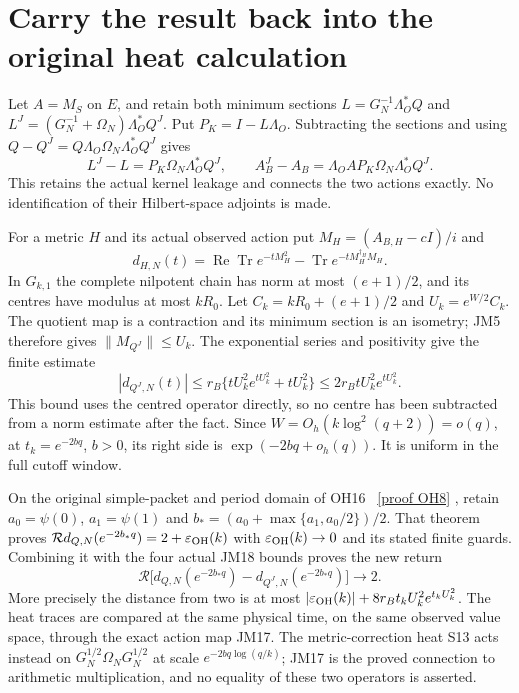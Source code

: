 \documentclass[11pt]{article}
\begin{document}
\section{Carry the result back into the original heat calculation}
Let $A=M_S$ on $E$, and retain both minimum sections
$L=G_N^{-1}\Lambda_O^*Q$ and
$L^J=(G_N^{-1}+\Omega_N)\Lambda_O^*Q^J$.
Put $P_K=I-L\Lambda_O$. Subtracting the sections and using
$Q-Q^J=Q\Lambda_O\Omega_N\Lambda_O^*Q^J$ gives
\[
 L^J-L=P_K\Omega_N\Lambda_O^*Q^J,\qquad
 A_B^J-A_B=\Lambda_OAP_K\Omega_N\Lambda_O^*Q^J.
 \tag{JM17}
\]
This retains the actual kernel leakage and connects the two actions
exactly. No identification of their Hilbert-space adjoints is made.

For a metric $H$ and its actual observed action put
$M_H=(A_{B,H}-cI)/i$ and
\[
 d_{H,N}(t)=\operatorname{Re}\operatorname{Tr}e^{-tM_H^2}
            -\operatorname{Tr}e^{-tM_H^{\dagger_H}M_H}.
\]
In $G_{k,1}$ the complete nilpotent chain has norm at most
$(e+1)/2$, and its centres have modulus at most $kR_0$.
Let $C_k=kR_0+(e+1)/2$ and $U_k=e^{W/2}C_k$.
The quotient map is a contraction and its minimum section is an
isometry; JM5 therefore gives $\|M_{Q^J}\|\le U_k$.
The exponential series and positivity give the finite estimate
\[
 |d_{Q^J,N}(t)|\le r_B\{tU_k^2e^{tU_k^2}+tU_k^2\}
 \le2r_BtU_k^2e^{tU_k^2}.\tag{JM18}
\]
This bound uses the centred operator directly, so no centre has been
subtracted from a norm estimate after the fact. Since
$W=O_h(k\log^2(q+2))=o(q)$, at $t_k=e^{-2bq}$, $b>0$, its right
side is $\exp(-2bq+o_h(q))$. It is uniform in the full cutoff window.

On the original simple-packet and period domain of OH16 \cite{mrjm:OH}%
~\href{https://github.com/KokunoYumeto/zeta-function-research-reader/blob/main/workbenches/splitzero-tandem/continuations/20260921-kernel-degree-steps/providers/OBSERVATION_COMPLETE_PROOFS.tex\#L305}{[proof OH8]}%
{},
retain $a_0=\psi(0)$, $a_1=\psi(1)$ and
$b_*=(a_0+\max\{a_1,a_0/2\})/2$.
That theorem proves
$\mathcal R d_{Q,N}(e^{-2b_*q})=2+\varepsilon_{\rm OH}(k)$ with
$\varepsilon_{\rm OH}(k)\to0$ and its stated finite guards.
Combining it with the four actual JM18 bounds proves the new return
\[
 \boxed{\mathcal R\bigl[d_{Q,N}(e^{-2b_*q})
 -d_{Q^J,N}(e^{-2b_*q})\bigr]\longrightarrow2.}\tag{JM19}
\]
More precisely the distance from two is at most
$|\varepsilon_{\rm OH}(k)|+8r_Bt_kU_k^2e^{t_kU_k^2}$.
The heat traces are compared at the same physical time, on the same
observed value space, through the exact action map JM17.
The metric-correction heat S13 acts instead on
$G_N^{1/2}\Omega_NG_N^{1/2}$ at scale $e^{-2bq\log(q/k)}$;
JM17 is the proved connection to arithmetic multiplication, and no
equality of these two operators is asserted.
\end{document}
